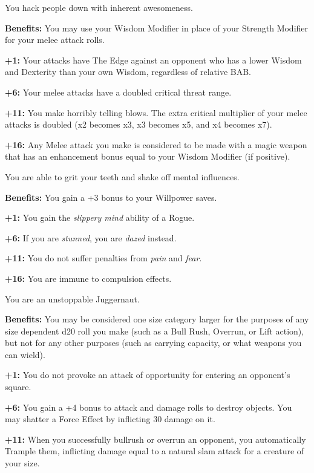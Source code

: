 You hack people down with inherent awesomeness.

\textbf{Benefits:} You may use your Wisdom Modifier in place of your Strength Modifier for your melee attack rolls.

\textbf{+1:} Your attacks have The Edge against an opponent who has a lower Wisdom and Dexterity than your own Wisdom, regardless of relative BAB.

\textbf{+6:} Your melee attacks have a doubled critical threat range.

\textbf{+11:} You make horribly telling blows. The extra critical multiplier of your melee attacks is doubled (x2 becomes x3, x3 becomes x5, and x4 becomes x7).

\textbf{+16:} Any Melee attack you make is considered to be made with a magic weapon that has an enhancement bonus equal to your Wisdom Modifier (if positive).


You are able to grit your teeth and shake off mental influences.

\textbf{Benefits:} You gain a +3 bonus to your Willpower saves.

\textbf{+1:} You gain the \textit{slippery mind} ability of a Rogue.

\textbf{+6:} If you are \textit{stunned}, you are \textit{dazed} instead.

\textbf{+11:} You do not suffer penalties from \textit{pain} and \textit{fear}.

\textbf{+16:} You are immune to compulsion effects.


You are an unstoppable Juggernaut.

\textbf{Benefits:} You may be considered one size category larger for the purposes of any size dependent d20 roll you make (such as a Bull Rush, Overrun, or Lift action), but not for any other purposes (such as carrying capacity, or what weapons you can wield).

\textbf{+1:} You do not provoke an attack of opportunity for entering an opponent's square.

\textbf{+6:} You gain a +4 bonus to attack and damage rolls to destroy objects. You may shatter a Force Effect by inflicting 30 damage on it.

\textbf{+11:} When you successfully bullrush or overrun an opponent, you automatically Trample them, inflicting damage equal to a natural slam attack for a creature of your size.

